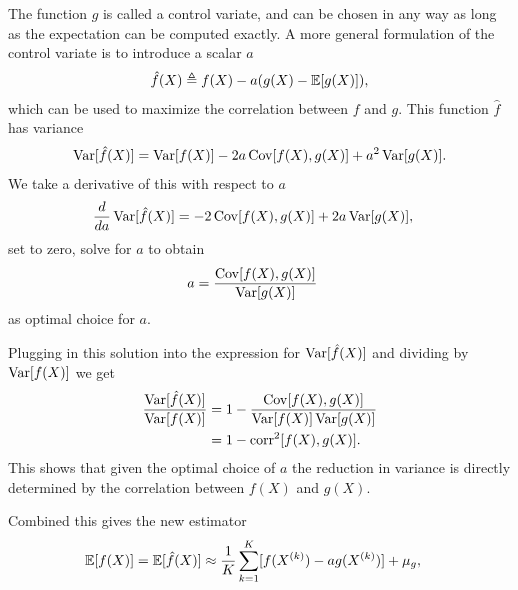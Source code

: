     The function $g$ is called a control variate, and can be chosen in any way as long as the expectation can be computed exactly. A more general formulation of the control variate is to introduce a scalar $a$
    \begin{align*}
        \hat{f}(X) \triangleq f(X) - a(g(X) - \operatorname{\mathbb{E}} [ g(X) ]),
    \end{align*}
    which can be used to maximize the correlation between $f$ and $g$. This function $\hat{f}$ has variance
    \begin{align*}
      \operatorname{Var} [ \hat{f}(X) ] = \operatorname{Var} [ f(X) ] - 2a  \operatorname{Cov} [ f(X), g(X) ] + a^2 \operatorname{Var} [ g(X) ].
    \end{align*}
    We take a derivative of this with respect to $a$
    \begin{align*}
        \frac{d}{d a}\operatorname{Var} [ \hat{f}(X) ] &= - 2  \operatorname{Cov} [ f(X), g(X) ] + 2a \operatorname{Var} [ g(X) ],
    \end{align*}
    set to zero, solve for $a$ to obtain
    \begin{align}
    \label{eq:cv-scale}
      a &= \frac{ \operatorname{Cov} [ f(X), g(X) ]}{ \operatorname{Var} [ g(X) ]}
    \end{align}
    as optimal choice for $a$.

    Plugging in this solution into the expression for $\operatorname{Var} [ \hat{f}(X) ]$ and dividing by $\operatorname{Var} [ f(X) ]$ we get
    \begin{align}
    \label{eq:var-red}
      \frac{\operatorname{Var} [ \hat{f}(X) ]}{\operatorname{Var} [ f(X) ]}
        &= 1 - \frac{\operatorname{Cov}[ f(X), g(X) ]}{ \operatorname{Var} [ f(X) ]  \operatorname{Var} [ g(X) ]} \\
        &= 1 - \operatorname{corr}^2 [ f(X), g(X) ].
    \end{align}
    This shows that given the optimal choice of $a$ the reduction in variance is directly determined by the correlation between $f(X)$ and $g(X)$.

    Combined this gives the new estimator
    \begin{align*}
      \operatorname{\mathbb{E}} [ f(X) ]
        &= \operatorname{\mathbb{E}} [ \hat{f}(X) ] \approx \frac{1}{K} \sum_{k=1}^K [ f(X^{(k)}) - ag(X^{(k)}) ] + \mu_{g},
    \end{align*}

